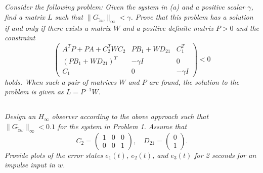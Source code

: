 \documentclass[12pt, letterpaper]{article}
\begin{document}
\subsection{}
\textit{
Consider the following problem: Given the system in (a) and a positive scalar $\gamma$, find a matrix $L$ such that $\|G_{\tilde{z}w}\|_\infty < \gamma$. Prove that this problem has a solution if and only if there exists a matrix $W$ and a positive definite matrix $P > 0$ and the constraint
\[
\begin{pmatrix}
A^TP + PA + C_2^TWC_2 & PB_1 + WD_{21} & C_1^T \\
(PB_1 + WD_{21})^T & -\gamma I & 0 \\
C_1 & 0 & -\gamma I
\end{pmatrix} < 0
\]
holds. When such a pair of matrices $W$ and $P$ are found, the solution to the problem is given as $L = P^{-1}W$.
}

\subsection{}
\textit{
Design an $H_\infty$ observer according to the above approach such that $\|G_{\tilde{z}w}\|_\infty < 0.1$ for the system in Problem 1. Assume that
\[
C_2 = \begin{pmatrix} 1 & 0 & 0 \\ 0 & 0 & 1 \end{pmatrix}, \quad D_{21} = \begin{pmatrix} 0 \\ 1 \end{pmatrix}.
\]
Provide plots of the error states $e_1(t)$, $e_2(t)$, and $e_3(t)$ for 2 seconds for an impulse input in $w$.
}
\end{document}
